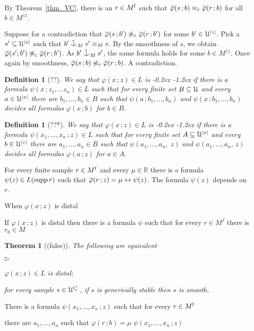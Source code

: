 \documentclass[10pt,openany]{article}
\newcommand{\mylabel}[1]{{\ssf{#1}}\hfill}
\renewenvironment{itemize}
  {\begin{list}{$\triangleright$}{%
   \setlength{\parskip}{0mm}
   \setlength{\topsep}{.4\baselineskip}
   \setlength{\rightmargin}{0mm}
   \setlength{\listparindent}{0mm}
   \setlength{\itemindent}{0mm}
   \setlength{\labelwidth}{3ex}
   \setlength{\itemsep}{.4\baselineskip}
   \setlength{\parsep}{0mm}
   \setlength{\partopsep}{0mm}
   \setlength{\labelsep}{1ex}
   \setlength{\leftmargin}{\labelwidth+\labelsep}
   \let\makelabel\mylabel}}{%
   \end{list}\vspace*{-\parskip}}
\def\RR{\mathds R}
\def\supp{\mathop{\rm supp}}
\newcommand{\sbar}[1]{\mkern 1.8mu\overline{\mkern-1.8mu#1\mkern-1mu}\mkern 1mu}
\def\cnonfork{\mathbin{\raise1.8ex\rlap{\kern0.6ex\rule{0.6ex}{0.1ex}}
\rlap{\kern1.1ex\rule{0.1ex}{1.9ex}}\raise-0.3ex\hbox{$\smile$} } }
\def\iff{\leftrightarrow}
\def\U{\EuScript U}
\def\phi{\varphi}
\def\epsilon{\varepsilon}
\def\ssf#1{\textsf{\small #1}}
\newcounter{thm}[section]
\theoremstyle{mio}
\newtheorem{theorem}[thm]{Theorem}
\newtheorem{definition}[thm]{Definition}
\theoremstyle{liscio}
\def\QED{\noindent\nolinebreak[4]\hspace{\stretch{1}}\rlap{\ \ $\Box$}\medskip}
\renewenvironment{proof}[1][Proof]%
{\begin{trivlist}\item[\hskip\labelsep {\bf #1}]}
{\QED\end{trivlist}}
\renewcommand*{\emph}[1]{%
   \kern-0.2ex 
   \smash{\tikz[baseline]
   \node[ rectangle, fill=emphcolor, rounded corners, 
          inner xsep=.3ex, inner ysep=.2ex, anchor=base,
          minimum height = 3ex
         ]{#1};
   }
   \kern-1.2ex 
}
\begin{document}
\begin{proof}
  By Theorem~\ref{thm_VC}, there is an $r\in M^{\rm f}$ such that $\sbar\phi(s\,;b)\approx_\epsilon\sbar\phi(r\,;b)$ for all $b\in M^{|z|}$.
  
  Suppose for a contradiction that $\sbar\phi(s\,;b')\not\approx_\epsilon\sbar\phi(r\,;b')$ for some $b'\in\U^{|z|}$.
  Pick a  $s'\subseteq\U^{|x|}$ such that $b'\cnonfork_{M}s'\equiv_Ms$.
  By the smoothness of $s$, we obtain $\sbar\phi(s';b')\not\approx_\epsilon\sbar\phi(r\,;b')$.
  As $b'\cnonfork_{M}s'$, the same formula holds for some $b\in M^{|z|}$.
  Once again by smoothness, $\sbar\phi(s\,;b)\not\approx_\epsilon\sbar\phi(r\,;b)$.
  A contradiction.
\end{proof}

\begin{definition}[??]
  We say that $\phi(x\,;z)\in L$ is \emph{distal\/} if there is a formula $\psi(x\,;z_1,\dots z_n)\in L$ such that for every finite set $B\subseteq\U$ and every $a\in\U^{|x|}$ there are $b_1,\dots,b_n\in B$ such that $\psi(a\,;b_1,\dots,b_n)$ and $\psi(x\,;b_1,\dots,b_n)$ decides all formulas $\phi(x\,; b)$ for $b\in B$.\QED
\end{definition}

\begin{definition}[??*]
  We say that $\phi(x\,;z)\in L$ is \emph{distal\/} if there is a formula $\psi(x_1,\dots,x_n\,;z)\in L$ such that for every finite set $A\subseteq\U^{|x|}$ and every $b\in\U^{|z|}$ there are $a_1,\dots,a_n\in B$ such that $\psi(a_1,\dots,a_n,\;z)$ and $\psi(a_1,\dots,a_n,\,z)$ decides all formulas $\phi(a\,; z)$ for $a\in A$.\QED
\end{definition}

For every finite sample $r\in M^{\rm f}$ and every $\mu\in\RR$ there is a formula $\psi(z)\in L(\supp r)$ such that $\sbar\phi(r\,;z)=\mu \iff \psi(z)$. The formula $\psi(z)$ depends on $r$.

When $\phi(x\,;z)$ is distal 


If  $\phi(x\,;z)$ is distal then there is a formula $\psi$ such that  for every $r\in M^f$ there is $r_0\in M^{}$

\begin{theorem}[(false)]
  The following are equivalent
  \begin{itemize}
    \item[1.] $\phi(x\,;z)\in L$ is distal;
    \item[2.] for every sample $s\in\U^{\rm f^+_*}$, if $s$ is generically stable then $s$ is smooth.

  \end{itemize}
\end{theorem}

There is a formula $\psi(x_1,\dots,x_n\,;z)$ such that for every $r\in M^{\rm f}$ 

there are $a_1,\dots,a_n$ such that $\phi(r\,;b)=\mu$ $\psi(x_1,\dots,x_n\,;z)$
\end{document}
